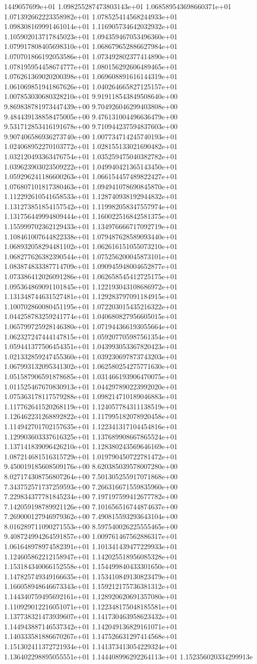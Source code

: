 1449057699e+01	1.098255287473803143e+01	1.068589543698660371e+01	1.071392662223358982e+01	1.078525414568244933e+01	1.098308169991461014e+01	1.116905734642032932e+01	1.105902013717845023e+01	1.094359467053496360e+01	1.079917808405698310e+01	1.068679652886627984e+01	1.070701866192053586e+01	1.073492802377414890e+01	1.078195954458674777e+01	1.080156292606489465e+01	1.076261369020200398e+01	1.069608891616144319e+01	1.061069851941867626e+01	1.040264665827125157e+01	1.007853030680328210e+01	9.919118543849508640e+00	9.869838781973447439e+00	9.704926046299403808e+00	9.484439138858475005e+00	9.476131004496636479e+00	9.531712853416191678e+00	9.710944237594837603e+00	9.907406586936273740e+00	1.007734714245740193e+01	1.024068952270103772e+01	1.028155133021690482e+01	1.032120493363476754e+01	1.035259475040382782e+01	1.039623903023509222e+01	1.049940421365143450e+01	1.059296241186600263e+01	1.066154457489822427e+01	1.076807101817380463e+01	1.094941078690845870e+01	1.112292610541658533e+01	1.128740938192944832e+01	1.131273851854157542e+01	1.119982058347557974e+01	1.131756449994809444e+01	1.160022516842581375e+01	1.155999702362129433e+01	1.134976666717092719e+01	1.108461007644822338e+01	1.079487628589093440e+01	1.068932058294481102e+01	1.062616151055073210e+01	1.068277626382390544e+01	1.075256200045873101e+01	1.083874833387714709e+01	1.090945948004652877e+01	1.073386412026091286e+01	1.062658545412725175e+01	1.095364869091101845e+01	1.122193043108686972e+01	1.131348744631527481e+01	1.129283797091184915e+01	1.100702860080451195e+01	1.072203015435216322e+01	1.044258783259241774e+01	1.040680827956605015e+01	1.065799725928146380e+01	1.071944366193055664e+01	1.062327247444147815e+01	1.059207705987561354e+01	1.059441377506454351e+01	1.043993053367820423e+01	1.021332859247455360e+01	1.039230697873743203e+01	1.067993132095341302e+01	1.062580254275771630e+01	1.051587906591878685e+01	1.031466193906470075e+01	1.011525467670830913e+01	1.044297890223992020e+01	1.075363178117579288e+01	1.098214710189046883e+01	1.117762641520268119e+01	1.124057784311138519e+01	1.126462231268892822e+01	1.117995182078920458e+01	1.114942701702157635e+01	1.122341317104454816e+01	1.129903603337616325e+01	1.137689908667865524e+01	1.137141839096426210e+01	1.128380243569646169e+01	1.087214681516315729e+01	1.019790450722781472e+01	9.450019185608509176e+00	8.620385039578007280e+00	8.027174308756807264e+00	7.501305255917071868e+00	7.343752571737259593e+00	7.266316671559835960e+00	7.229834377781845234e+00	7.197197599412677782e+00	7.142059198789921126e+00	7.101656516744874637e+00	7.269000127946979362e+00	7.490815593293643104e+00	8.016289711090271553e+00	8.597540026225555465e+00	9.408724994264591857e+00	1.009761467562886317e+01	1.061648978974582391e+01	1.101341439477229933e+01	1.124605862212158947e+01	1.142025518956085328e+01	1.153184340066152558e+01	1.154499840433301650e+01	1.147825749349166635e+01	1.153410849130823479e+01	1.166058948646673343e+01	1.159212175736381312e+01	1.144340759495692161e+01	1.128920620691357080e+01	1.110929012216051071e+01	1.122348175048185581e+01	1.137738321473939607e+01	1.141730463958623432e+01	1.144943887146537342e+01	1.142049136829161071e+01	1.140333581886670267e+01	1.147526631297414568e+01	1.151302411372721934e+01	1.141373413054229324e+01	1.136402298895055551e+01	1.144408996292264113e+01	1.152356020334299913e